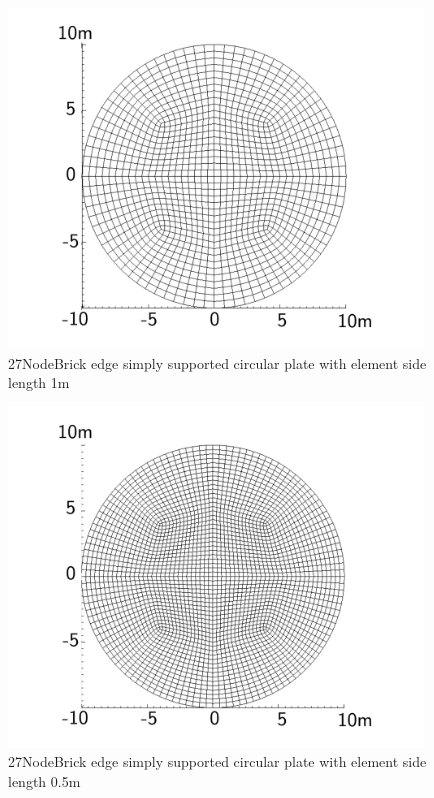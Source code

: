 \documentclass[fleqn,11pt]{article}
\begin{document}
\begin{figure}[H]
  \centering
  \includegraphics[width=11cm]{../Figure-files/circular_plate4.pdf}
  \caption{27NodeBrick edge simply supported circular plate with element side length 1m }
  \label{fig 27NodeBrick edges simply supported circular plate with element side length 1m }
\end{figure}


\begin{figure}[H]
  \centering
  \includegraphics[width=11cm]{../Figure-files/circular_plate5.pdf}
  \caption{27NodeBrick edge simply supported circular plate with element side length 0.5m }
  \label{fig 27NodeBrick edges simply supported circular plate with element side length 0.5m }
\end{figure}

\newpage
\end{document}
